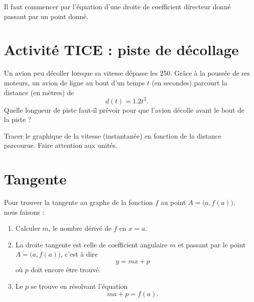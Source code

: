 
Il faut commencer par l'équation d'une droite de coefficient directeur donné passant par un point donné.

\section{Activité TICE : piste de décollage}

Un avion peu décoller lorsque sa vitesse dépasse les \unit{250}{\kilo\meter\per\hour}. Grâce à la poussée de ses moteurs, un avion de ligne au bout d'un temps \( t\) (en secondes) parcourt la distance (en mètres) de 
\begin{equation}
    d(t)=1.2t^2.
\end{equation}
Quelle longueur de piste faut-il prévoir pour que l'avion décolle avant le bout de la piste ?

Tracer le graphique de la vitesse (instantanée) en fonction de la distance parcourue. Faire attention aux unités.

\section{Tangente}

\begin{Aretenir}
    Pour trouver la tangente au graphe de la fonction \( f\) au point \( A=\big( a,f(a) \big)\), nous faisons :
    \begin{enumerate}
        \item
            Calculer \( m\), le nombre dérivé de $f$ en \( x=a\).
        \item
            La droite tangente est celle de coefficient angulaire \( m\) et passant par le point \( A=\big( a,f(a) \big)\), c'est à dire
            \begin{equation}
                y=mx+p
            \end{equation}
            où \( p\) doit encore être trouvé.
        \item
            Le \( p\) se trouve en résolvant l'équation
            \begin{equation}
                ma+p=f(a).
            \end{equation}
    \end{enumerate}
\end{Aretenir}

